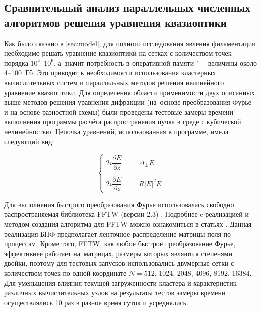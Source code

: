 \subsection{Сравнительный анализ параллельных численных алгоритмов решения уравнения квазиоптики}
\label{subsec:AppVs}

Как было сказано в \ref{sec:model}, для полного исследования явления филаментации необходимо решать уравнение квазиоптики на сетках
с количеством точек порядка $10^4$--$10^6$, а~значит потребность в оперативной памяти "--- величины около 4--100~Гб.
Это приводит к необходимости использования кластерных вычислительных систем и параллельных методов решения нелинейного уравнение квазиоптики.
Для определения области применимости двух описанных выше методов решения уравнения дифракции (на~основе преобразования Фурье и на основе разностной схемы)
были проведены тестовые замеры времени выполнения программы расчёта распространения пучка в среде с кубической  нелинейностью.
Цепочка уравнений, использованная в программе, имела следующий вид:

\begin{equation}\label{VarVsSplit}
    \left\{
    \begin{array}{rcl}
        2i\dfrac{\partial E}{\partial z} & = & \Delta_{\perp}E \\
        \\
        2i\dfrac{\partial E}{\partial z} & = & R\left|E\right|^2E
    \end{array}
    \right.
\end{equation}

Для выполнения быстрого преобразования Фурье использовалась свободно распространяемая библиотека FFTW (версии 2.3) \cite{FFTW}.
Подробнее c реализацией и методом создания алгоритма для FFTW можно ознакомиться в статьях \cite{FFTW1_98, FFTW2_Generator_99}.
Данная реализация БПФ предполагает ленточное распределение матрицы поля по процессам. Кроме того, FFTW, как любое быстрое преобразование Фурье,
эффективнее работает на~матрицах, размеры которых являются степенями двойки, поэтому для тестовых запусков использовались двумерные сетки
с количеством точек по одной координате $N = 512$, 1024, 2048, 4096, 8192, 16384. Для уменьшения влияния текущей загруженности кластера
и характеристик различных вычислительных узлов на результаты тестов замеры времени осуществлялись 10 раз в разное время суток и усреднялись.

